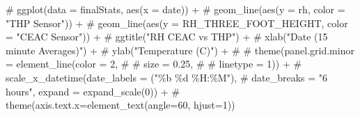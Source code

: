 \documentclass[
  letterpaper,
  DIV=11,
  numbers=noendperiod]{scrartcl}
\newenvironment{Shaded}{\begin{snugshade}}{\end{snugshade}}
\newcommand{\CommentTok}[1]{\textcolor[rgb]{0.37,0.37,0.37}{#1}}
\begin{document}
\begin{Shaded}
\begin{Highlighting}[]
\CommentTok{\# ggplot(data = finalStats, aes(x = date)) +}
\CommentTok{\#          geom\_line(aes(y = rh, color = "THP Sensor")) +}
\CommentTok{\#          geom\_line(aes(y = RH\_THREE\_FOOT\_HEIGHT, color = "CEAC Sensor")) +}
\CommentTok{\#          ggtitle("RH CEAC vs THP") +}
\CommentTok{\#          xlab("Date (15 minute Averages)") +}
\CommentTok{\#          ylab("Temperature (C)") +}
\CommentTok{\#          \# theme(panel.grid.minor = element\_line(color = 2,}
\CommentTok{\#                                         \# size = 0.25,}
\CommentTok{\#                                         \# linetype = 1)) +}
\CommentTok{\#            scale\_x\_datetime(date\_labels = ("\%b \%d \%H:\%M"),}
\CommentTok{\#           date\_breaks = "6 hours",  expand = expand\_scale(0)) +}
\CommentTok{\#           theme(axis.text.x=element\_text(angle=60, hjust=1))}
\end{Highlighting}
\end{Shaded}
\end{document}
